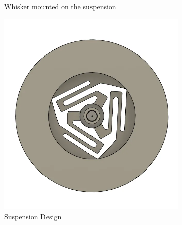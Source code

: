 \begin{figure}[ht]
\begin{subfigure}{0.31\textwidth}
        \caption{Whisker mounted on the suspension} \label{fig:whisker}
    \end{subfigure}
    \hspace*{\fill}
    \begin{subfigure}{0.31\textwidth}
        \centering
        \includegraphics[width=\linewidth]{figures/suspension}
        \caption{Suspension Design} \label{fig:suspension}
    \end{subfigure}
    \hspace*{\fill}
    \begin{subfigure}{0.31\textwidth}
        \centering

\end{subfigure}
\end{figure}
